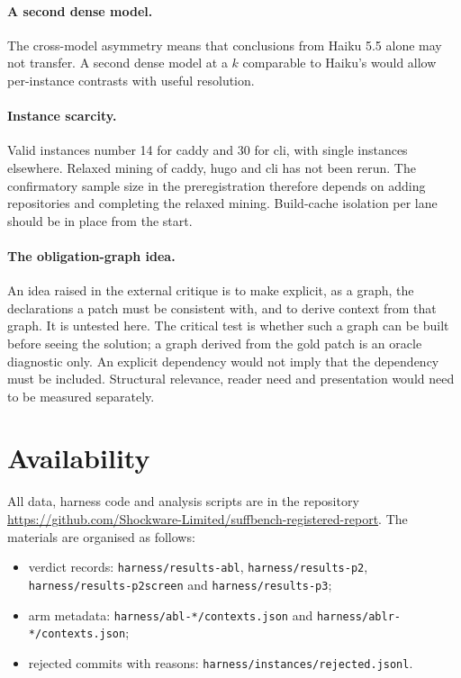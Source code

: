 \paragraph{A second dense model.} The cross-model asymmetry means that conclusions from Haiku 5.5 alone may not transfer. A second dense model at a $k$ comparable to Haiku's would allow per-instance contrasts with useful resolution.

\paragraph{Instance scarcity.} Valid instances number 14 for caddy and 30 for cli, with single instances elsewhere. Relaxed mining of caddy, hugo and cli has not been rerun. The confirmatory sample size in the preregistration therefore depends on adding repositories and completing the relaxed mining. Build-cache isolation per lane should be in place from the start.

\paragraph{The obligation-graph idea.} An idea raised in the external critique is to make explicit, as a graph, the declarations a patch must be consistent with, and to derive context from that graph. It is untested here. The critical test is whether such a graph can be built before seeing the solution; a graph derived from the gold patch is an oracle diagnostic only. An explicit dependency would not imply that the dependency must be included. Structural relevance, reader need and presentation would need to be measured separately.

\section{Availability}

All data, harness code and analysis scripts are in the repository \url{https://github.com/Shockware-Limited/suffbench-registered-report}. The materials are organised as follows:
\begin{itemize}
\item verdict records: \texttt{harness/results-abl}, \texttt{harness/results-p2}, \texttt{harness/results-p2screen} and \texttt{harness/results-p3};
\item arm metadata: \texttt{harness/abl-*/contexts.json} and \texttt{harness/ablr-*/contexts.json};
\item rejected commits with reasons: \texttt{harness/instances/rejected.jsonl}.
\end{itemize}


